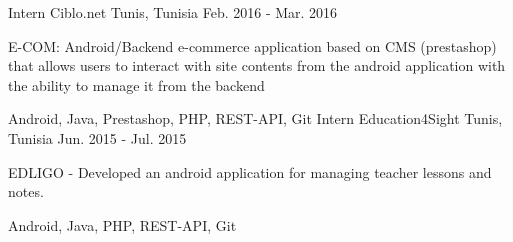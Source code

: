 \begin{cventries}
  \cventrydetailed
    {Intern} %
    {Ciblo.net} %
    {Tunis, Tunisia} %
    {Feb. 2016 - Mar. 2016} %
    {
      \begin{cvitems} %
        \item {E-COM: Android/Backend e-commerce application based on CMS
        	(prestashop) that allows users to interact with site contents from the
        	android application with the ability to manage it from the backend}
      \end{cvitems}
    }
    {Android, Java, Prestashop, PHP, REST-API, Git} %
  \cventrydetailed
    {Intern} %
    {Education4Sight} %
    {Tunis, Tunisia} %
    {Jun. 2015 - Jul. 2015} %
    {
    	\begin{cvitems} %
    		\item {EDLIGO - Developed an android application for managing teacher lessons and notes.}
    	\end{cvitems}
    }
    {Android, Java, PHP, REST-API, Git} %

\end{cventries}
